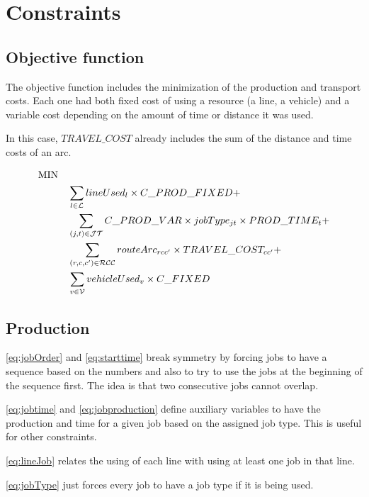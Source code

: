 \section{Constraints}

\subsection{Objective function}

The objective function includes the minimization of the production and transport costs. Each one had both fixed cost of using a resource (a line, a vehicle) and a variable cost depending on the amount of time or distance it was used.

In this case, $TRAVEL\_COST$ already includes the sum of the distance and time costs of an arc.

\begin{align}
\mbox{MIN} \quad &\notag\\
& \sum_{l \in \mathcal{L}} lineUsed_l \times C\_PROD\_FIXED + \notag\\
& \sum_{(j, t) \in \mathcal{JT}} C\_PROD\_VAR \times jobType_{jt} \times PROD\_TIME_t + \notag\\
& \sum_{(r, c, c') \in \mathcal{RCC}} routeArc_{rcc'} \times TRAVEL\_COST_{cc'} + \notag\\
& \sum_{v \in \mathcal{V}} vehicleUsed_v \times C\_FIXED 	\label{eq:of}
\end{align}

\subsection{Production}

\ref{eq:jobOrder} and \ref{eq:starttime} break symmetry by forcing jobs to have a sequence based on the numbers and also to try to use the jobs at the beginning of the sequence first. The idea is that two consecutive jobs cannot overlap.

\ref{eq:jobtime} and \ref{eq:jobproduction} define auxiliary variables to have the production and time for a given job based on the assigned job type. This is useful for other constraints.

\ref{eq:lineJob} relates the using of each line with using at least one job in that line.

\ref{eq:jobType} just forces every job to have a job type if it is being used.

